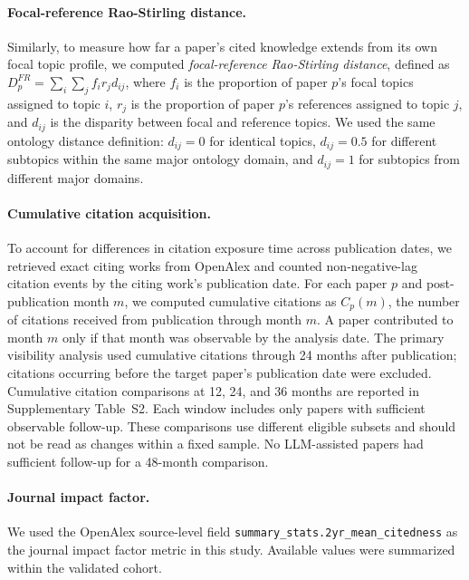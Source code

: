 \paragraph{Focal-reference Rao-Stirling distance.}
Similarly, to measure how far a paper's cited knowledge extends from its own focal topic profile, we computed \textit{focal-reference Rao-Stirling distance}, defined as $D_p^{FR} = \sum_i \sum_j f_i r_j d_{ij}$, where $f_i$ is the proportion of paper $p$'s focal topics assigned to topic $i$, $r_j$ is the proportion of paper $p$'s references assigned to topic $j$, and $d_{ij}$ is the disparity between focal and reference topics. We used the same ontology distance definition: $d_{ij}=0$ for identical topics, $d_{ij}=0.5$ for different subtopics within the same major ontology domain, and $d_{ij}=1$ for subtopics from different major domains.

\paragraph{Cumulative citation acquisition.}
To account for differences in citation exposure time across publication dates, we retrieved exact citing works from OpenAlex and counted non-negative-lag citation events by the citing work's publication date. For each paper $p$ and post-publication month $m$, we computed cumulative citations as $C_p(m)$, the number of citations received from publication through month $m$. A paper contributed to month $m$ only if that month was observable by the analysis date. The primary visibility analysis used cumulative citations through 24 months after publication; citations occurring before the target paper's publication date were excluded.
Cumulative citation comparisons at 12, 24, and 36 months are reported in Supplementary Table~S2. Each window includes only papers with sufficient observable follow-up. These comparisons use different eligible subsets and should not be read as changes within a fixed sample. No LLM-assisted papers had sufficient follow-up for a 48-month comparison.

\paragraph{Journal impact factor.} We used the OpenAlex source-level field \nolinkurl{summary_stats.2yr_mean_citedness} as the journal impact factor metric in this study. Available values were summarized within the validated cohort.

